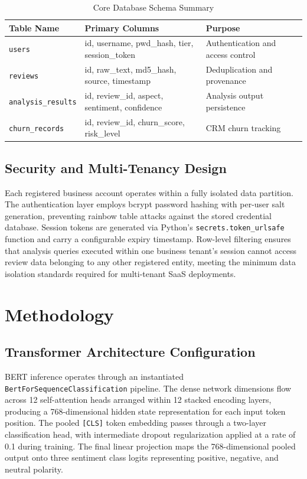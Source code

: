 \documentclass[12pt,a4paper]{report}
\begin{document}
\begin{table}[H]
\centering
\caption{Core Database Schema Summary}
\label{tab:schema}
\begin{tabular}{@{}lll@{}}
\toprule
\textbf{Table Name} & \textbf{Primary Columns} & \textbf{Purpose} \\
\midrule
\texttt{users}           & id, username, pwd\_hash, tier, session\_token & Authentication and access control \\
\texttt{reviews}         & id, raw\_text, md5\_hash, source, timestamp  & Deduplication and provenance \\
\texttt{analysis\_results} & id, review\_id, aspect, sentiment, confidence & Analysis output persistence \\
\texttt{churn\_records}  & id, review\_id, churn\_score, risk\_level     & CRM churn tracking \\
\bottomrule
\end{tabular}
\end{table}

\section{Security and Multi-Tenancy Design}
Each registered business account operates within a fully isolated data partition. The authentication layer employs bcrypt password hashing with per-user salt generation, preventing rainbow table attacks against the stored credential database. Session tokens are generated via Python's \texttt{secrets.token\_urlsafe} function and carry a configurable expiry timestamp. Row-level filtering ensures that analysis queries executed within one business tenant's session cannot access review data belonging to any other registered entity, meeting the minimum data isolation standards required for multi-tenant SaaS deployments.

\chapter{Methodology}

\section{Transformer Architecture Configuration}
BERT inference operates through an instantiated \texttt{BertForSequenceClassification} pipeline. The dense network dimensions flow across 12 self-attention heads arranged within 12 stacked encoding layers, producing a 768-dimensional hidden state representation for each input token position. The pooled \texttt{[CLS]} token embedding passes through a two-layer classification head, with intermediate dropout regularization applied at a rate of 0.1 during training. The final linear projection maps the 768-dimensional pooled output onto three sentiment class logits representing positive, negative, and neutral polarity.
\end{document}

